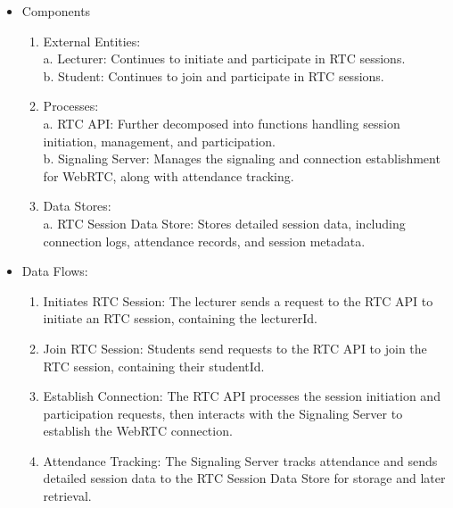 \documentclass[a4paper,12pt]{article}  %
\begin{document}
\begin{itemize}
      \item Components
            \begin{enumerate}
                  \item External Entities: \\
                        a. Lecturer: Continues to initiate and participate in RTC
                        sessions. \\
                        b. Student: Continues to join and participate in RTC sessions.\\
                  \item Processes: \\
                        a. RTC API: Further decomposed into functions handling session
                        initiation, management, and participation. \\
                        b. Signaling Server: Manages the signaling and connection establishment for WebRTC, along with attendance
                        tracking.\\
                  \item Data Stores:\\
                        a. RTC Session Data Store: Stores detailed session data, including
                        connection logs, attendance records, and session metadata.\\
            \end{enumerate}
      \item Data Flows:
            \begin{enumerate}
                  \item Initiates RTC Session: The lecturer sends a request to the RTC API to initiate an RTC session, containing the lecturerId.\\
                  \item Join RTC Session: Students send requests to the RTC API to join the RTC session, containing their studentId.\\
                  \item Establish Connection: The RTC API processes the session initiation and participation requests, then interacts with the Signaling Server to establish the WebRTC connection.\\
                  \item Attendance Tracking: The Signaling Server tracks attendance and sends detailed session data to the RTC Session Data Store for storage and later retrieval.\\

\end{enumerate}
\end{itemize}
\end{document}
